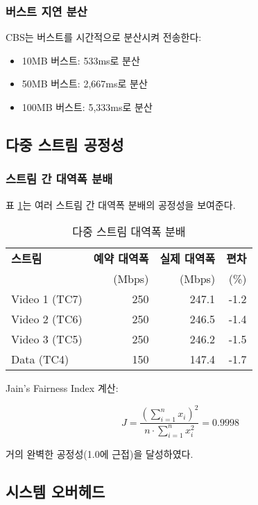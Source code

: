 \documentclass[twocolumn,10pt]{article}
\begin{document}
\subsubsection{버스트 지연 분산}

CBS는 버스트를 시간적으로 분산시켜 전송한다:

\begin{itemize}
    \item 10MB 버스트: 533ms로 분산
    \item 50MB 버스트: 2,667ms로 분산
    \item 100MB 버스트: 5,333ms로 분산
\end{itemize}

\subsection{다중 스트림 공정성}

\subsubsection{스트림 간 대역폭 분배}

표 \ref{tab:fairness}는 여러 스트림 간 대역폭 분배의 공정성을 보여준다.

\begin{table}[h]
\centering
\caption{다중 스트림 대역폭 분배}
\label{tab:fairness}
\begin{tabular}{lrrr}
\toprule
\textbf{스트림} & \textbf{예약 대역폭} & \textbf{실제 대역폭} & \textbf{편차} \\
 & (Mbps) & (Mbps) & (\%) \\
\midrule
Video 1 (TC7) & 250 & 247.1 & -1.2 \\
Video 2 (TC6) & 250 & 246.5 & -1.4 \\
Video 3 (TC5) & 250 & 246.2 & -1.5 \\
Data (TC4) & 150 & 147.4 & -1.7 \\
\bottomrule
\end{tabular}
\end{table}

Jain's Fairness Index 계산:

\begin{equation}
J = \frac{(\sum_{i=1}^{n} x_i)^2}{n \cdot \sum_{i=1}^{n} x_i^2} = 0.9998
\end{equation}

거의 완벽한 공정성(1.0에 근접)을 달성하였다.

\subsection{시스템 오버헤드}
\end{document}

